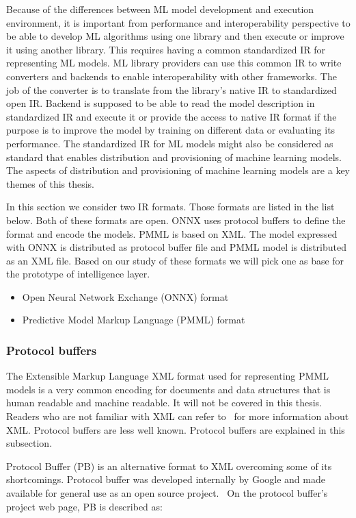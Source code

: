 \documentclass[english, 12pt, a4paper, elec, utf8, online]{aaltothesis}
\begin{document}
Because of the differences between ML model development and execution environment, it is important from performance and interoperability perspective to be able to develop ML algorithms using one library and then execute or improve it using another library. This requires having a common standardized IR for representing ML models. ML library providers can use this common IR to write converters and backends to enable interoperability with other frameworks. The job of the converter is to translate from the library's native IR to standardized open IR. Backend is supposed to be able to read the model description in standardized IR and execute it or provide the access to native IR format if the purpose is to improve the model by training on different data or evaluating its performance. The standardized IR for ML models might also be considered as standard that enables distribution and provisioning of machine learning models. The aspects of distribution and provisioning of machine learning models are a key themes of this thesis.

In this section we consider two IR formats. Those formats are listed in the list below. Both of these formats are open. ONNX uses protocol buffers to define the format  and encode the models. PMML is based on XML. The model expressed with ONNX is distributed as protocol buffer file and PMML model is distributed as an XML file. Based on our study of these formats we will pick one as base for the prototype of intelligence layer.

\begin{itemize}
\item
Open Neural Network Exchange (ONNX) format
\item
Predictive Model Markup Language (PMML) format
\end{itemize}

\subsubsection{Protocol buffers}
The Extensible Markup Language XML format used for representing PMML models is a very common encoding for documents and data structures that is human readable and machine readable. It will not be covered in this thesis. Readers who are not familiar with XML can refer to~\cite{bray2008extensible} for more information about XML. Protocol buffers are less well known. Protocol buffers are explained in this subsection.

Protocol Buffer (PB) is an alternative format to XML overcoming some of its shortcomings. Protocol buffer was developed internally by Google and made available for general use as an open source project.~\cite{kaur2010evaluation} On the protocol buffer's project web page, PB is described as:
\end{document}
